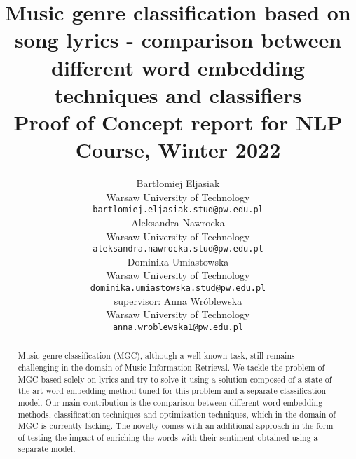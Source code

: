 \documentclass[11pt]{article}
\title{Music genre classification based on song lyrics - comparison between different word embedding techniques and classifiers \\Proof of Concept report for NLP Course, Winter 2022}
\author{Bartłomiej Eljasiak \\
  Warsaw University of Technology \\
  {\tt\small bartlomiej.eljasiak.stud@pw.edu.pl} \\\And
  Aleksandra Nawrocka \\
  Warsaw University of Technology \\
  {\tt\small aleksandra.nawrocka.stud@pw.edu.pl} \\
  \AND
  Dominika Umiastowska \\
  Warsaw University of Technology \\
  {\tt\small dominika.umiastowska.stud@pw.edu.pl} \\\And 
  supervisor: Anna Wróblewska\\
  Warsaw University of Technology \\
  {\tt\small anna.wroblewska1@pw.edu.pl}\\}
\date{}
\begin{document}
\raggedbottom

\maketitle

\vspace{5em}

\begin{abstract}
Music genre classification (MGC), although a well-known task, still remains challenging in the domain of Music Information Retrieval. We tackle the problem of MGC based solely on lyrics and try to solve it using a solution composed of a state-of-the-art word embedding method tuned for this problem and a separate classification model. Our main contribution is the comparison between different word embedding methods, classification techniques and optimization techniques, which in the domain of MGC is currently lacking. The novelty comes with an additional approach in the form of testing the impact of enriching the words with their sentiment obtained using a separate model.
\end{abstract}









\printbibliography
\end{document}
